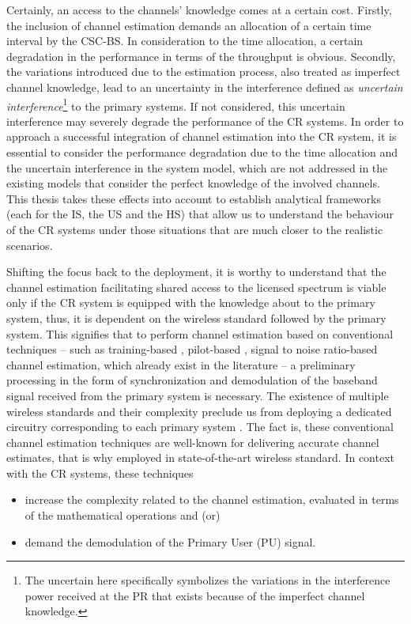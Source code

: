 Certainly, an access to the channels' knowledge comes at a certain cost. Firstly, the inclusion of channel estimation demands an allocation of a certain time interval by the CSC-BS. In consideration to the time allocation, a certain degradation in the performance in terms of the throughput is obvious. Secondly, the variations introduced due to the estimation process, also treated as imperfect channel knowledge, lead to an uncertainty in the interference defined as \textit{uncertain interference}\footnote{The uncertain here specifically symbolizes the variations in the interference power received at the PR that exists because of the imperfect channel knowledge.} to the primary systems. If not considered, this uncertain interference may severely degrade the performance of the CR systems. In order to approach a successful integration of channel estimation into the CR system, it is essential to consider the performance degradation due to the time allocation and the uncertain interference in the system model, which are not addressed in the existing models that consider the perfect knowledge of the involved channels. This thesis takes these effects into account to establish analytical frameworks (each for the IS, the US and the HS) that allow us to understand the behaviour of the CR systems under those situations that are much closer to the realistic scenarios. %

Shifting the focus back to the deployment, it is worthy to understand that the channel estimation facilitating shared access to the licensed spectrum is viable only if the CR system is equipped with the knowledge about to the primary system, thus, it is dependent on the wireless standard followed by the primary system. This signifies that to perform channel estimation based on conventional techniques -- such as training-based \cite{Stoica03}, pilot-based \cite{Gifford05, Gifford08}, signal to noise ratio-based \cite{Chav11, Sharma13} channel estimation, which already exist in the literature -- a preliminary processing in the form of synchronization and demodulation of the baseband signal received from the primary system is necessary. The existence of multiple wireless standards and their complexity preclude us from deploying a dedicated circuitry corresponding to each primary system \cite{Ghasemi08_cm}. The fact is, these conventional channel estimation techniques are well-known for delivering accurate channel estimates, that is why employed in state-of-the-art wireless standard. In context with the CR systems, these techniques \begin{itemize} \item increase the complexity related to the channel estimation, evaluated in terms of the mathematical operations and (or) \item demand the demodulation of the Primary User (PU) signal. \end{itemize} 


